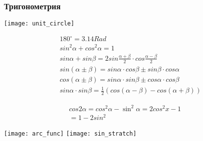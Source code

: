 \documentclass[10pt,a4paper]{scrartcl}
\begin{document}
	\subsubsection*{Тригонометрия}
	\begin{minipage}{0.40\linewidth}
	\texttt{[image: unit\_circle]} \\
	\end{minipage}
	\hfill
	\begin{minipage}{0.6\linewidth}
		\begin{align*}
		& 180^\circ = 3.14 Rad \\
		& sin^2\alpha + cos^2\alpha = 1 \\
		&sin \alpha + sin \beta = 2 sin \frac{\alpha + \beta}{2} \cdot cos \frac{\alpha - \beta}{2}\\
		&sin(\alpha \pm \beta) = sin \alpha \cdot cos \beta \pm sin \beta \cdot cos \alpha \\
		&cos(\alpha \pm \beta) = sin \alpha \cdot sin \beta \pm cos \alpha \cdot cos \beta \\		
		&sin \alpha \cdot sin \beta = \frac{1}{2}(cos(\alpha - \beta) - cos(\alpha + \beta))
		\end{align*}
		\begin{minipage}{1\linewidth}
		\begin{align*}
		cos 2 \alpha = cos^2 \alpha - \sin^2 \alpha = 2cos^2x-1& \\
		=1-2sin^2&
		\end{align*}
		\end{minipage}
	\end{minipage}
	\texttt{[image: arc\_func]}
	\hfill
	\texttt{[image: sin\_stratch]}

\newpage
\end{document}

